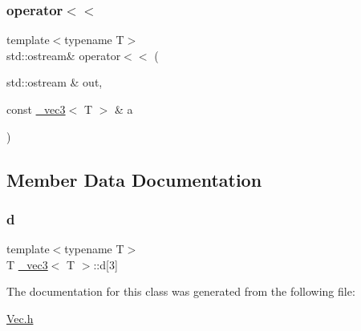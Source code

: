 \subsubsection{\texorpdfstring{operator$<$$<$}{operator<<}}
{\footnotesize\ttfamily template$<$typename T$>$ \\
std\+::ostream\& operator$<$$<$ (\begin{DoxyParamCaption}\item[{std\+::ostream \&}]{out,  }\item[{const \hyperlink{class__vec3}{\+\_\+vec3}$<$ T $>$ \&}]{a }\end{DoxyParamCaption})\hspace{0.3cm}{\ttfamily [friend]}}



\subsection{Member Data Documentation}
\mbox{\label{class__vec3_a5b0c52131143a6e240867d956714a52a}} 
\subsubsection{\texorpdfstring{d}{d}}
{\footnotesize\ttfamily template$<$typename T$>$ \\
T \hyperlink{class__vec3}{\+\_\+vec3}$<$ T $>$\+::d\mbox{[}3\mbox{]}\hspace{0.3cm}{\ttfamily [protected]}}



The documentation for this class was generated from the following file\+:\begin{DoxyCompactItemize}
\item 
\hyperlink{Vec_8h}{Vec.\+h}\end{DoxyCompactItemize}
